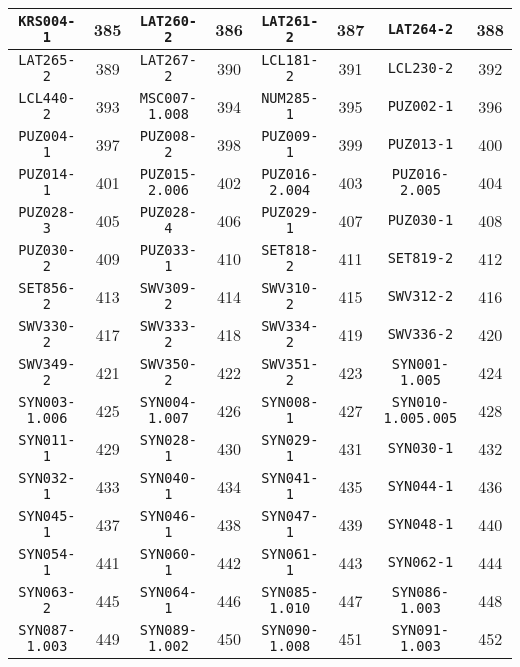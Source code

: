 \documentclass[./main.tex]{subfiles}
\begin{document}
\begin{table}[H]
\begin{tabular}{|c|c|c|c|c|c|c|c|}
\hline
\texttt{KRS004-1} & 385 & \texttt{LAT260-2} & 386 & \texttt{LAT261-2} & 387 & \texttt{LAT264-2} & 388\\
\hline
\texttt{LAT265-2} & 389 & \texttt{LAT267-2} & 390 & \texttt{LCL181-2} & 391 & \texttt{LCL230-2} & 392\\
\hline
\texttt{LCL440-2} & 393 & \texttt{MSC007-1.008} & 394 & \texttt{NUM285-1} & 395 & \texttt{PUZ002-1} & 396\\
\hline
\texttt{PUZ004-1} & 397 & \texttt{PUZ008-2} & 398 & \texttt{PUZ009-1} & 399 & \texttt{PUZ013-1} & 400\\
\hline
\texttt{PUZ014-1} & 401 & \texttt{PUZ015-2.006} & 402 & \texttt{PUZ016-2.004} & 403 & \texttt{PUZ016-2.005} & 404\\
\hline
\texttt{PUZ028-3} & 405 & \texttt{PUZ028-4} & 406 & \texttt{PUZ029-1} & 407 & \texttt{PUZ030-1} & 408\\
\hline
\texttt{PUZ030-2} & 409 & \texttt{PUZ033-1} & 410 & \texttt{SET818-2} & 411 & \texttt{SET819-2} & 412\\
\hline
\texttt{SET856-2} & 413 & \texttt{SWV309-2} & 414 & \texttt{SWV310-2} & 415 & \texttt{SWV312-2} & 416\\
\hline
\texttt{SWV330-2} & 417 & \texttt{SWV333-2} & 418 & \texttt{SWV334-2} & 419 & \texttt{SWV336-2} & 420\\
\hline
\texttt{SWV349-2} & 421 & \texttt{SWV350-2} & 422 & \texttt{SWV351-2} & 423 & \texttt{SYN001-1.005} & 424\\
\hline
\texttt{SYN003-1.006} & 425 & \texttt{SYN004-1.007} & 426 & \texttt{SYN008-1} & 427 & \texttt{SYN010-1.005.005} & 428\\
\hline
\texttt{SYN011-1} & 429 & \texttt{SYN028-1} & 430 & \texttt{SYN029-1} & 431 & \texttt{SYN030-1} & 432\\
\hline
\texttt{SYN032-1} & 433 & \texttt{SYN040-1} & 434 & \texttt{SYN041-1} & 435 & \texttt{SYN044-1} & 436\\
\hline
\texttt{SYN045-1} & 437 & \texttt{SYN046-1} & 438 & \texttt{SYN047-1} & 439 & \texttt{SYN048-1} & 440\\
\hline
\texttt{SYN054-1} & 441 & \texttt{SYN060-1} & 442 & \texttt{SYN061-1} & 443 & \texttt{SYN062-1} & 444\\
\hline
\texttt{SYN063-2} & 445 & \texttt{SYN064-1} & 446 & \texttt{SYN085-1.010} & 447 & \texttt{SYN086-1.003} & 448\\
\hline
\texttt{SYN087-1.003} & 449 & \texttt{SYN089-1.002} & 450 & \texttt{SYN090-1.008} & 451 & \texttt{SYN091-1.003} & 452\\

\end{tabular}
\end{table}
\end{document}
